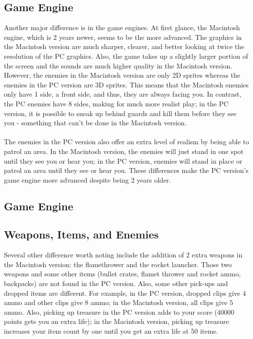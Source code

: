 \documentclass[book.tex]{subfiles}
\begin{document}
\subsection{Game Engine}
Another major difference is in the game engines. At first glance, the Macintosh engine, which is 2 years newer, seems to be the more advanced. The graphics in the Macintosh version are much sharper, clearer, and better looking at twice the resolution of the PC graphics. Also, the game takes up a slightly larger portion of the screen and the sounds are much higher quality in the Macintosh version.\\
However, the enemies in the Macintosh version are only 2D sprites whereas the enemies in the PC version are 3D sprites. This means that the Macintosh enemies only have 1 side, a front side, and thus, they are always facing you. In contrast, the PC enemies have 8 sides, making for much more realist play; in the PC version, it is possible to sneak up behind guards and kill them before they see you - something that can't be done in the Macintosh version.\\
\\
The enemies in the PC version also offer an extra level of realism by being able to patrol an area. In the Macintosh version, the enemies will just stand in one spot until they see you or hear you; in the PC version, enemies will stand in place or patrol an area until they see or hear you. These differences make the PC version's game engine more advanced despite being 2 years older.\\
\subsection{Game Engine}


\subsection{Weapons, Items, and Enemies}

Several other difference worth noting include the addition of 2 extra weapons in the Macintosh version: the flamethrower and the rocket launcher. Those two weapons and some other items (bullet crates, flamet thrower and rocket ammo, backpacks) are not found in the PC version.
Also, some other pick-ups and dropped items are different. For example, in the PC version, dropped clips give 4 ammo and other clips give 8 ammo; in the Macintosh version, all clips give 5 ammo. Also, picking up treasure in the PC version adds to your score (40000 points gets you an extra life); in the Macintosh version, picking up treasure increases your item count by one until you get an extra life at 50 items.
\end{document}
